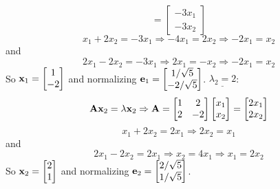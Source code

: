 \begin{enumerate}[font=\bfseries]
\[            =
            \begin{bmatrix}
                -3x_1 \\
                -3x_2
            \end{bmatrix}
        \]
        \[
            x_1 + 2x_2 = -3x_1
            \Rightarrow
            -4x_1 = 2x_2
            \Rightarrow
            -2x_1 = x_2
        \]
        and
        \[
            2x_1 - 2x_2 = -3x_1
            \Rightarrow
            2x_1 = -x_2
            \Rightarrow
            -2x_1 = x_2
        \]
        So $\bold{x}_1 = \begin{bmatrix}
            1 \\
            -2
        \end{bmatrix}$ and normalizing $\bold{e}_1 = \begin{bmatrix}
            1/\sqrt{5} \\
            -2/\sqrt{5}
        \end{bmatrix}$.
        \newline
        $\underline{\lambda_2 = 2}$:
        \[
            \bold{A}\bold{x}_2 = \lambda\bold{x}_2
            \Rightarrow
            \bold{A} = \begin{bmatrix}
                1 & 2 \\
                2 & -2
            \end{bmatrix}
            \begin{bmatrix}
                x_1 \\
                x_2
            \end{bmatrix}
            =
            \begin{bmatrix}
                2x_1 \\
                2x_2
            \end{bmatrix}
        \]
        \[
            x_1 + 2x_2 = 2x_1
            \Rightarrow
            2x_2 = x_1
        \]
        and
        \[
            2x_1 - 2x_2 = 2x_1
            \Rightarrow
            x_2 = 4x_1
            \Rightarrow
            x_1 = 2x_2
        \]
        So $\bold{x}_2 = \begin{bmatrix}
            2 \\
            1
        \end{bmatrix}$ and normalizing $\bold{e}_2 = \begin{bmatrix}
            2/\sqrt{5} \\
            1/\sqrt{5}
        \end{bmatrix}$.

\end{enumerate}
